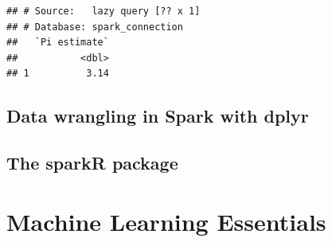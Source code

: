 \documentclass[]{book}
\newenvironment{Shaded}{\begin{snugshade}}{\end{snugshade}}
\newcommand{\CommentTok}[1]{\textcolor[rgb]{0.56,0.35,0.01}{\textit{#1}}}
\newcommand{\ControlFlowTok}[1]{\textcolor[rgb]{0.13,0.29,0.53}{\textbf{#1}}}
\newcommand{\DataTypeTok}[1]{\textcolor[rgb]{0.13,0.29,0.53}{#1}}
\newcommand{\DecValTok}[1]{\textcolor[rgb]{0.00,0.00,0.81}{#1}}
\newcommand{\KeywordTok}[1]{\textcolor[rgb]{0.13,0.29,0.53}{\textbf{#1}}}
\newcommand{\NormalTok}[1]{#1}
\newcommand{\OperatorTok}[1]{\textcolor[rgb]{0.81,0.36,0.00}{\textbf{#1}}}
\newcommand{\OtherTok}[1]{\textcolor[rgb]{0.56,0.35,0.01}{#1}}
\newcommand{\StringTok}[1]{\textcolor[rgb]{0.31,0.60,0.02}{#1}}
\theoremstyle{definition}
\theoremstyle{definition}
\theoremstyle{definition}
\theoremstyle{remark}
\begin{document}
\begin{Shaded}
\end{Shaded}

\begin{verbatim}
## # Source:   lazy query [?? x 1]
## # Database: spark_connection
##   `Pi estimate`
##           <dbl>
## 1          3.14
\end{verbatim}

\hypertarget{data-wrangling-in-spark-with-dplyr}{%
\section{Data wrangling in Spark with
dplyr}\label{data-wrangling-in-spark-with-dplyr}}

\hypertarget{the-sparkr-package}{%
\section{The sparkR package}\label{the-sparkr-package}}

\hypertarget{machine-learning-essentials}{%
\chapter{Machine Learning
Essentials}\label{machine-learning-essentials}}
\end{document}
